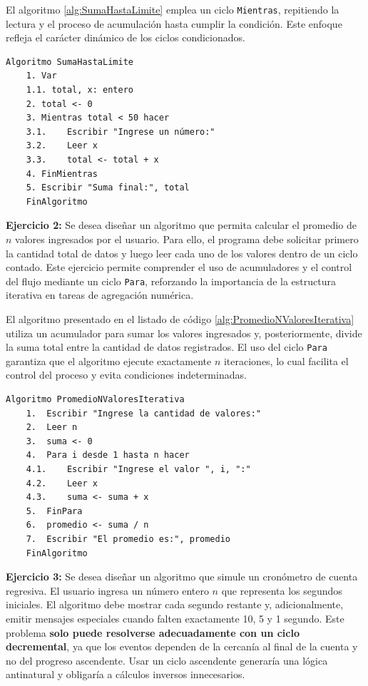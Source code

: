\documentclass[12pt,twoside]{book}
\begin{document}
						El algoritmo \ref{alg:SumaHastaLimite} emplea un ciclo \texttt{Mientras}, repitiendo la lectura y el proceso de acumulación hasta cumplir la condición. Este enfoque refleja el carácter dinámico de los ciclos condicionados.
						
						\begin{lstlisting}[style=upsamStyle,caption={Ciclo condicional para sumar hasta superar un límite},label={alg:SumaHastaLimite}]
	Algoritmo SumaHastaLimite
	1. Var
	1.1. total, x: entero
	2. total <- 0
	3. Mientras total < 50 hacer
	3.1.	Escribir "Ingrese un número:"
	3.2.	Leer x
	3.3.	total <- total + x
	4. FinMientras
	5. Escribir "Suma final:", total
	FinAlgoritmo \end{lstlisting}
	
						\noindent
						\textbf{Ejercicio 2:} Se desea diseñar un algoritmo que permita calcular el promedio de \( n \) valores ingresados por el usuario. Para ello, el programa debe solicitar primero la cantidad total de datos y luego leer cada uno de los valores dentro de un ciclo contado. Este ejercicio permite comprender el uso de acumuladores y el control del flujo mediante un ciclo \texttt{Para}, reforzando la importancia de la estructura iterativa en tareas de agregación numérica.
						
						El algoritmo presentado en el listado de código \ref{alg:PromedioNValoresIterativa} utiliza un acumulador para sumar los valores ingresados y, posteriormente, divide la suma total entre la cantidad de datos registrados. El uso del ciclo \texttt{Para} garantiza que el algoritmo ejecute exactamente \( n \) iteraciones, lo cual facilita el control del proceso y evita condiciones indeterminadas.
						
						\begin{lstlisting}[style=upsamStyle,caption={Cálculo del promedio de n valores},label={alg:PromedioNValoresIterativa}]
	Algoritmo PromedioNValoresIterativa
	1.  Escribir "Ingrese la cantidad de valores:"
	2.  Leer n
	3.  suma <- 0
	4.  Para i desde 1 hasta n hacer
	4.1.	Escribir "Ingrese el valor ", i, ":"
	4.2.	Leer x
	4.3.	suma <- suma + x
	5.  FinPara
	6.  promedio <- suma / n
	7.  Escribir "El promedio es:", promedio
	FinAlgoritmo \end{lstlisting}		
						
						\noindent
						\textbf{Ejercicio 3:} Se desea diseñar un algoritmo que simule un cronómetro de cuenta regresiva. El usuario ingresa un número entero \( n \) que representa los segundos iniciales. El algoritmo debe mostrar cada segundo restante y, adicionalmente, emitir mensajes especiales cuando falten exactamente 10, 5 y 1 segundo. Este problema \textbf{solo puede resolverse adecuadamente con un ciclo decremental}, ya que los eventos dependen de la cercanía al final de la cuenta y no del progreso ascendente. Usar un ciclo ascendente generaría una lógica antinatural y obligaría a cálculos inversos innecesarios.
						
\end{document}
